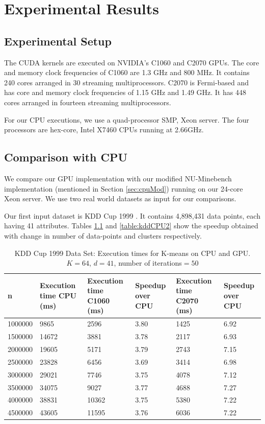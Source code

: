\chapter{Experimental Results}
\section{Experimental Setup}
The CUDA kernels are executed on NVIDIA's C1060 and C2070 GPUs. The core and memory clock frequencies of C1060 are 1.3 GHz and 800 MHz. It contains 240 cores arranged in 30 streaming multiprocessors. C2070 is Fermi-based and has core and memory clock frequencies of 1.15 GHz and 1.49 GHz. It has 448 cores arranged in fourteen streaming multiprocessors.

For our CPU executions, we use a quad-processor SMP, Xeon server. The four processors are hex-core, Intel X7460 CPUs running at 2.66GHz.

\section{Comparison with CPU}
We compare our GPU implementation with our modified NU-Minebench implementation (mentioned in Section \ref{sec:cpuMod}) running on our 24-core Xeon server. 
We use two real world datasets as input for our comparisons. 

Our first input dataset is KDD Cup 1999 \cite{kdd}. It contains 4,898,431 data points, each having 41 attributes. Tables \ref{table:kddCPU} and \ref{table:kddCPU2} show the speedup obtained with change in number of data-points and clusters respectively.

\begin{table}[htbp]
\begin{center}
\begin{tabular}{|r|p{2.8cm}|p{2.8cm}|p{2cm}|p{2.8cm}|p{2cm}|}
\hline
\multicolumn{1}{|l|}{n} & \multicolumn{1}{p{2.8cm}|}{Execution time CPU (ms)} & \multicolumn{1}{p{2.8cm}|}{Execution time C1060 (ms)} & \multicolumn{1}{p{2cm}|}{Speedup over CPU} & Execution time C2070 (ms) & \multicolumn{1}{p{2cm}|}{Speedup over CPU} \\ \hline
1000000 & 9865 & 2596 & 3.80 & 1425 & 6.92 \\ \hline
1500000 & 14672 & 3881 & 3.78 & 2117 & 6.93 \\ \hline
2000000 & 19605 & 5171 & 3.79 & 2743 & 7.15 \\ \hline
2500000 & 23828 & 6456 & 3.69 & 3414 & 6.98 \\ \hline
3000000 & 29021 & 7746 & 3.75 & 4078 & 7.12 \\ \hline
3500000 & 34075 & 9027 & 3.77 & 4688 & 7.27 \\ \hline
4000000 & 38831 & 10362 & 3.75 & 5380 & 7.22 \\ \hline
4500000 & 43605 & 11595 & 3.76 & 6036 & 7.22 \\ \hline
\end{tabular}
\end{center}
\caption{KDD Cup 1999 Data Set: Execution times for K-means on CPU and GPU. $K = 64$, $d = 41$, number of iterations$ = 50$}
\label{table:kddCPU}
\end{table}

